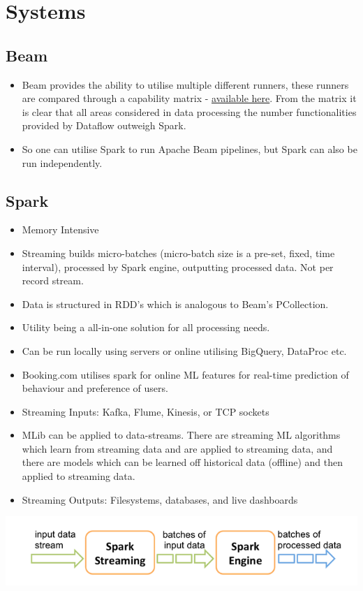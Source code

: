 \documentclass[english]{article}
\begin{document}
\section{Systems}
\subsection{Beam}
\begin{itemize}
\item Beam provides the ability to utilise multiple different runners, these runners are compared through a capability matrix - \href{https://beam.apache.org/documentation/runners/capability-matrix/}{available here}. From the matrix it is clear that all areas considered in data processing the number functionalities provided by Dataflow outweigh Spark.
\item So one can utilise Spark to run Apache Beam pipelines, but Spark can also be run independently.
\end{itemize}
\subsection{Spark}
\begin{itemize}
\item Memory Intensive
\item Streaming builds micro-batches (micro-batch size is a pre-set, fixed, time interval), processed by Spark engine, outputting processed data. Not per record stream.
\item Data is structured in RDD's which is analogous to Beam's PCollection.
\item Utility being a all-in-one solution for all processing needs.
\item Can be run locally using servers or online utilising BigQuery, DataProc etc.
\item Booking.com utilises spark for online ML features for real-time prediction of behaviour and preference of users.
\item Streaming Inputs: Kafka, Flume, Kinesis, or TCP sockets
\item MLib can be applied to data-streams. There are streaming ML algorithms which learn from streaming data and are applied to streaming data, and there are models which can be learned off historical data (offline) and then applied to streaming data.
\item Streaming Outputs: Filesystems, databases, and live dashboards
\end{itemize}
\includegraphics[scale=0.5]{spark_streaming_model.png}
\\\\
\end{document}
